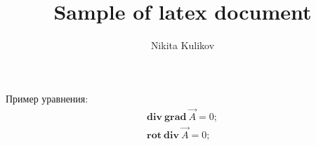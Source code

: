 \documentclass[a4paper, 14pt, russian]{article}
\title{Sample of latex document}
\author{Nikita Kulikov}
\date{}
\newcommand{\bea}{\begin{eqnarray}}
\newcommand{\eea}{\end{eqnarray}}
\newcommand{\rot}{\textbf{rot}~}
\renewcommand{\div}{\textbf{div}~}
\renewcommand{\grad}{\textbf{grad}~}
\begin{document}
\maketitle

Пример уравнения:
	\bea
		\div \grad \vec A = 0;\\
		\rot \div \vec A = 0;
	\eea
\end{document}
